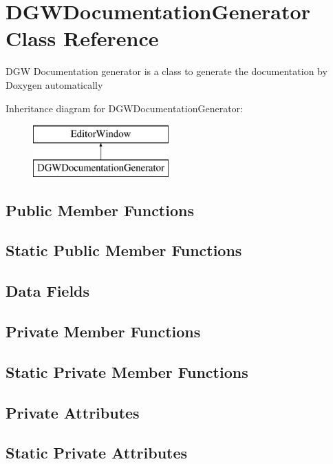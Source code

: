 \hypertarget{classDoxygenGeneratorWindow_1_1DGWDocumentationGenerator}{}\section{D\+G\+W\+Documentation\+Generator Class Reference}
\label{classDoxygenGeneratorWindow_1_1DGWDocumentationGenerator}


D\+GW Documentation generator is a class to generate the documentation by Doxygen automatically  


Inheritance diagram for D\+G\+W\+Documentation\+Generator\+:\begin{figure}[H]
\begin{center}
\leavevmode
\includegraphics[height=2.000000cm]{d9/dac/classDoxygenGeneratorWindow_1_1DGWDocumentationGenerator}
\end{center}
\end{figure}
\subsection*{Public Member Functions}
\subsection*{Static Public Member Functions}
\subsection*{Data Fields}
\subsection*{Private Member Functions}
\subsection*{Static Private Member Functions}
\subsection*{Private Attributes}
\subsection*{Static Private Attributes}



